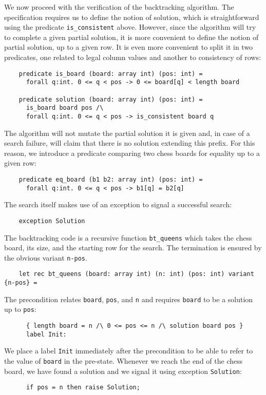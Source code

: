 We now proceed with the verification of the backtracking algorithm.
The specification requires us to define the notion of solution, which
is straightforward using the predicate \verb|is_consistent| above.
However, since the algorithm will try to complete a given partial
solution, it is more convenient to define the notion of partial
solution, up to a given row. It is even more convenient to split it in
two predicates, one related to legal column values and another to
consistency of rows:
\begin{verbatim}
    predicate is_board (board: array int) (pos: int) =
      forall q:int. 0 <= q < pos -> 0 <= board[q] < length board

    predicate solution (board: array int) (pos: int) =
      is_board board pos /\
      forall q:int. 0 <= q < pos -> is_consistent board q
\end{verbatim}
The algorithm will not mutate the partial solution it is given and,
in case of a search failure, will claim that there is no solution
extending this prefix. For this reason, we introduce a predicate
comparing two chess boards for equality up to a given row:
\begin{verbatim}
    predicate eq_board (b1 b2: array int) (pos: int) =
      forall q:int. 0 <= q < pos -> b1[q] = b2[q]
\end{verbatim}
The search itself makes use of an exception to signal a successful search:
\begin{verbatim}
    exception Solution
\end{verbatim}
The backtracking code is a recursive function \verb|bt_queens| which
takes the chess board, its size, and the starting row for the search.
The termination is ensured by the obvious variant \texttt{n-pos}.
\begin{verbatim}
    let rec bt_queens (board: array int) (n: int) (pos: int) variant {n-pos} =
\end{verbatim}
The precondition relates \texttt{board}, \texttt{pos}, and \texttt{n}
and requires \texttt{board} to be a solution up to \texttt{pos}:
\begin{verbatim}
      { length board = n /\ 0 <= pos <= n /\ solution board pos }
      label Init:
\end{verbatim}
We place a label \texttt{Init} immediately after the precondition to
be able to refer to the value of \texttt{board} in the pre-state.
Whenever we reach the end of the chess board, we have found a solution
and we signal it using exception \texttt{Solution}:
\begin{verbatim}
      if pos = n then raise Solution;
\end{verbatim}
